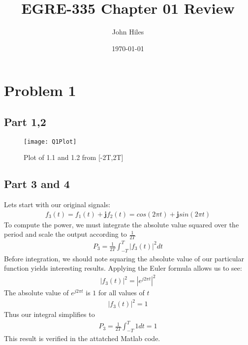 \documentclass{article}
\title{EGRE-335 Chapter 01 Review}
\author{John Hiles}
\date\today
\numberwithin{equation}{section}
\begin{document}
\maketitle %


\section{Problem 1}
\subsection{Part 1,2}
\begin{figure}[hbt!]
\centering
\texttt{[image: Q1Plot]}
\caption{Plot of 1.1 and 1.2 from [-2T,2T]}
\end{figure}

\subsection{Part 3 and 4}
Lets start with our original signals:
\begin{align*}
f_3(t) = f_1(t) + \mathbf{j} f_2(t) = cos(2\pi t) + \mathbf{j} sin(2\pi t)
\end{align*}
To compute the power, we must integrate the absolute value squared over the period and scale the output according to $\frac{1}{2T}$
\begin{align*}
P_3 = \frac{1}{2T} \int_{-T}^{T} |f_3(t)|^2 dt
\end{align*}
Before integration, we should note squaring the absolute value of our particular function yields interesting results. Applying the Euler formula allows us to see:
\begin{align*}
|f_3(t)|^2 =  |e^{j 2\pi t}|^2
\end{align*}
The absolute value of $e^{j 2\pi t}$ is $1$ for all values of $t$
\begin{align*}
|f_3(t)|^2 =  1
\end{align*}
Thus our integral simplifies to 
\begin{align*}
\boxed{P_3 = \frac{1}{2T} \int_{-T}^{T} 1 dt = 1}
\end{align*}
This result is verified in the attatched Matlab code.
\end{document}
